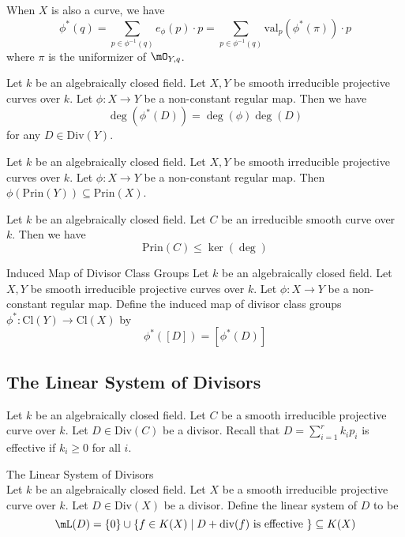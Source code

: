 \documentclass[a4paper]{article}
\begin{document}
When $X$ is also a curve, we have $$\phi^\ast(q)=\sum_{p\in\phi^{-1}(q)}e_\phi(p)\cdot p=\sum_{p\in\phi^{-1}(q)}\text{val}_p(\phi^\ast(\pi))\cdot p$$ where $\pi$ is the uniformizer of $\mO_{Y,q}$. 

\begin{prp}{}{} Let $k$ be an algebraically closed field. Let $X,Y$ be smooth irreducible projective curves over $k$. Let $\phi:X\to Y$ be a non-constant regular map. Then we have $$\deg(\phi^\ast(D))=\deg(\phi)\deg(D)$$ for any $D\in\text{Div}(Y)$. 
\end{prp}

\begin{prp}{}{} Let $k$ be an algebraically closed field. Let $X,Y$ be smooth irreducible projective curves over $k$. Let $\phi:X\to Y$ be a non-constant regular map. Then $\phi(\text{Prin}(Y))\subseteq\text{Prin}(X)$. 
\end{prp}

\begin{prp}{}{} Let $k$ be an algebraically closed field. Let $C$ be an irreducible smooth curve over $k$. Then we have $$\text{Prin}(C)\leq\ker(\deg)$$
\end{prp}

\begin{defn}{Induced Map of Divisor Class Groups}{} Let $k$ be an algebraically closed field. Let $X,Y$ be smooth irreducible projective curves over $k$. Let $\phi:X\to Y$ be a non-constant regular map. Define the induced map of divisor class groups $\phi^\ast:\text{Cl}(Y)\to\text{Cl}(X)$ by $$\phi^\ast([D])=[\phi^\ast(D)]$$
\end{defn}

\subsection{The Linear System of Divisors}
Let $k$ be an algebraically closed field. Let $C$ be a smooth irreducible projective curve over $k$. Let $D\in\text{Div}(C)$ be a divisor. Recall that $D=\sum_{i=1}^rk_ip_i$ is effective if $k_i\geq0$ for all $i$. 

\begin{defn}{The Linear System of Divisors}{}\\
Let $k$ be an algebraically closed field. Let $X$ be a smooth irreducible projective curve over $k$. Let $D\in\text{Div}(X)$ be a divisor. Define the linear system of $D$ to be $$\mL(D)=\{0\}\cup\{f\in K(X)\;|\;D+\text{div}(f)\text{ is effective }\}\subseteq K(X)$$
\end{defn}
\end{document}
